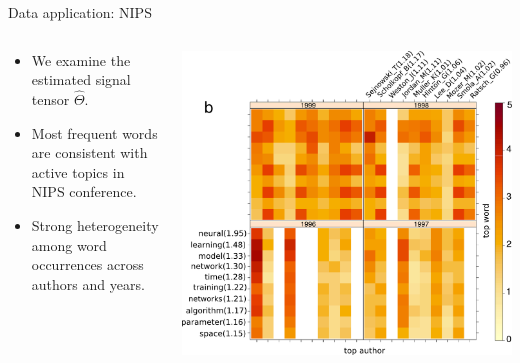 \documentclass[10pt, mathserif]{beamer} %
\theoremstyle{definition}
\theoremstyle{plain}
\begin{document}
\begin{frame}{Data application: NIPS}
\begin{columns}
\begin{column}{0.6\textwidth}
 \begin{itemize}
     \item We examine the estimated signal tensor $\hat\Theta.$
     \item Most frequent words are consistent with active topics in NIPS conference. 
     \item Strong heterogeneity among word occurrences across authors and years.
 \end{itemize}
\end{column}
\begin{column}{0.4\textwidth} 
   \begin{center}
     \includegraphics[width=\textwidth]{Figures/signal.pdf}
     \end{center}
\end{column}
\end{columns}
\end{frame}
\end{document}
